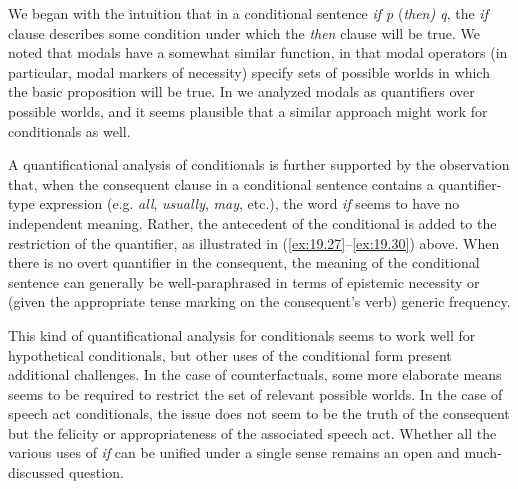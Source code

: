 We began with the intuition that in a conditional sentence \textit{if p} (\textit{then) q}, the \textit{if} clause describes some condition under which the \textit{then} clause will be true. We noted that modals have a somewhat similar function, in that modal operators (in particular, modal markers of necessity) specify sets of possible worlds in which the basic proposition will be true. In  we analyzed modals as quantifiers over possible worlds, and it seems plausible that a similar approach might work for conditionals as well.



A quantificational analysis of conditionals is further supported by the observation that, when the consequent clause in a conditional sentence contains a quantifier-type expression (e.g. \textit{all}, \textit{usually}, \textit{may}, etc.), the word \textit{if} seems to have no independent meaning. Rather, the antecedent of the conditional is added to the restriction of the quantifier, as illustrated in (\ref{ex:19.27}--\ref{ex:19.30}) above. When there is no overt quantifier in the consequent, the meaning of the conditional sentence can generally be well-paraphrased in terms of epistemic necessity or (given the appropriate tense marking on the consequent’s verb) generic frequency.



This kind of quantificational analysis for conditionals seems to work well for hypothetical conditionals, but other uses of the conditional form present additional challenges. In the case of counterfactuals, some more elaborate means seems to be required to restrict the set of relevant possible worlds. In the case of speech act conditionals, the issue does not seem to be the truth of the consequent but the felicity or appropriateness of the associated speech act. Whether all the various uses of \textit{if} can be unified under a single sense remains an open and much-discussed question.




